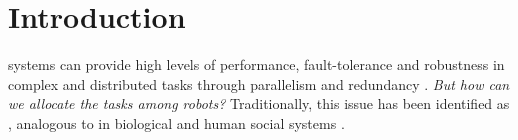 \documentclass[journal]{IEEEtran}
\begin{document}

%
\section{Introduction}
% 
% 
% 
% 
 systems can provide high levels of performance, fault-tolerance and robustness in complex and distributed tasks through parallelism and redundancy \cite{Arkin1998,Parker+2006}. %
 \textit{But how can we allocate the tasks among robots?} Traditionally, this issue has been identified as  \cite{Gerkey+2004}, analogous to  in biological and human social systems \cite{Sendova-Franks+1999}.
\end{document}
